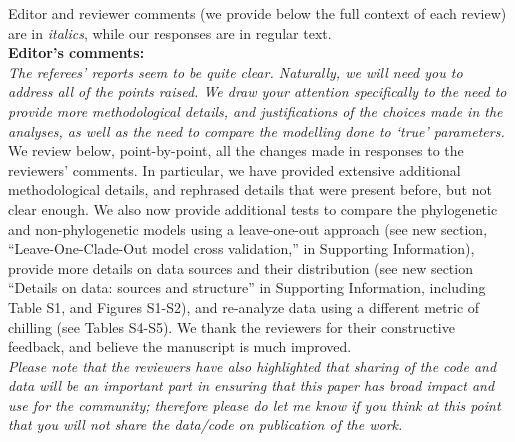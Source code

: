 \documentclass[11pt]{article}
\begin{document}
Editor and reviewer comments (we provide below the full context of each review) are in \emph{italics}, while our responses are in regular text. 
\\ %

{\bf Editor's comments:} \\


\emph{The referees’ reports seem to be quite clear. Naturally, we will need you to address all of the points raised. We draw your attention specifically to the need to provide more methodological details, and justifications of the choices made in the analyses, as well as the need to compare the modelling done to `true' parameters.}\\

We review below, point-by-point, all the changes made in responses to the reviewers' comments. In particular, we have provided extensive additional methodological details, and rephrased details that were present before, but not clear enough. We also now provide additional tests to compare the phylogenetic and non-phylogenetic models using a leave-one-out approach (see new section, ``Leave-One-Clade-Out model cross validation,'' in Supporting Information), provide more details on data sources and their distribution (see new section ``Details on data: sources and structure'' in Supporting Information, including Table S1, and Figures S1-S2), and re-analyze data using a different metric of chilling (see Tables S4-S5). We thank the reviewers for their constructive feedback, and believe the manuscript is much improved.\\

\emph{Please note that the reviewers have also highlighted that sharing of the code and data will be an important part in ensuring that this paper has broad impact and use for the community; therefore please do let me know if you think at this point that you will not share the data/code on publication of the work.}\\
\end{document}
